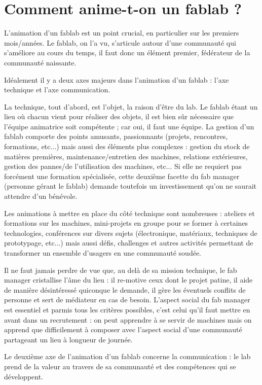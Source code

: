\documentclass[a4paper,10pt]{scrartcl}
\begin{document}
\section{Comment anime-t-on un fablab ?}
L'animation d'un fablab est un point crucial, en particulier sur les premiers mois/années. Le fablab, on l'a vu, s'articule autour d'une communauté qui s'améliore au cours du temps, il faut donc un élément premier, fédérateur de la communauté naissante.

Idéalement il y a deux axes majeurs dans l'animation d'un fablab : l'axe technique et l'axe communication.

La technique, tout d'abord, est l'objet, la raison d'être du lab. Le fablab étant un lieu où chacun vient pour réaliser des objets, il est bien sûr nécessaire que l'équipe animatrice soit compétente ; car oui, il faut une équipe.
La gestion d'un fablab comporte des points amusants, passionnants (projets, rencontres, formations, etc...) mais aussi des éléments plus complexes : gestion du stock de matières premières, maintenance/entretien des machines, relations extérieures, gestion des pannes/de l'utilisation des machines, etc...
Si elle ne requiert pas forcément une formation spécialisée, cette deuxième facette du fab manager (personne gérant le fablab) demande toutefois un investissement qu'on ne saurait attendre d'un bénévole.

Les animations à mettre en place du côté technique sont nombreuses : ateliers et formations sur les machines, mini-projets en groupe pour se former à certaines technologies, conférences sur divers sujets (électronique, matériaux, techniques de prototypage, etc...) mais aussi défis, challenges et autres activités permettant de transformer un ensemble d'usagers en une communauté soudée.

Il ne faut jamais perdre de vue que, au delà de sa mission technique, le fab manager cristallise l'âme du lieu : il re-motive ceux dont le projet patine, il aide de manière désintéressé quiconque le demande, il gère les éventuels conflits de personne et sert de médiateur en cas de besoin. L'aspect social du fab manager est essentiel et parmis tous les critères possibles, c'est celui qu'il faut mettre en avant dans un recrutement : on peut apprendre à se servir de machines mais on apprend que difficilement à composer avec l'aspect social d'une communauté partageant un lieu à longueur de journée.

Le deuxième axe de l'animation d'un fablab concerne la communication : le lab prend de la valeur au travers de sa communauté et des compétences qui se développent.
\end{document}
